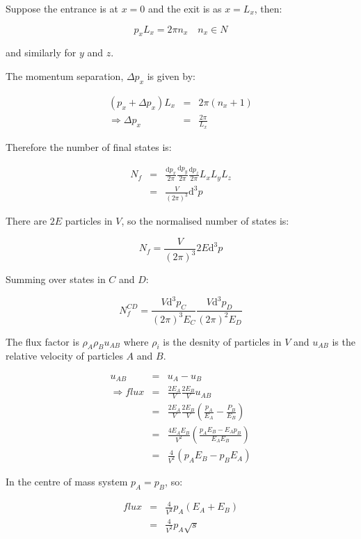 Suppose the entrance is at $x = 0$ and the exit is as $x = L_x$, then:

\[
  p_xL_x = 2\pi n_x \quad n_x \in N
\]

and similarly for $y$ and $z$.

The momentum separation, $\Delta p_x$ is given by:

\begin{eqnarray*}
  \left(p_x + \Delta p_x\right) L_x & = & 2\pi\left(n_x + 1\right) \\
  \Rightarrow \Delta p_x & = & \frac{2\pi}{L_x}
\end{eqnarray*}

Therefore the number of final states is:

\begin{eqnarray*}
  N_f & = & \frac{\mathrm{d}p_x}{2\pi}\frac{\mathrm{d}p_y}{2\pi}\frac{\mathrm{d}p_z}{2\pi}L_xL_yL_z \\
  & = & \frac{V}{\left(2\pi\right)^3}\mathrm{d}^3p
\end{eqnarray*}

There are $2E$ particles in $V$, so the normalised number of states is:

\[
  N_f = \frac{V}{\left(2\pi\right)^3}2E\mathrm{d}^3p
\]

Summing over states in $C$ and $D$:

\[
  N^{CD}_f = \frac{V\mathrm{d}^3p_C}{\left(2\pi\right)^3E_C}\frac{V\mathrm{d}^3p_D}{\left(2\pi\right)^2E_D}
\]

The flux factor is $\rho_A\rho_B u_{AB}$ where $\rho_i$ is the desnity of particles in $V$ and $u_{AB}$ is the relative velocity of particles $A$ and $B$.

\begin{eqnarray*}
  u_{AB} & = & u_A - u_B \\
  \Rightarrow flux & = & \frac{2E_A}{V}\frac{2E_B}{V}u_{AB} \\
  & = & \frac{2E_A}{V}\frac{2E_B}{V}\left(\frac{p_A}{E_A}-\frac{P_B}{E_B}\right) \\
  & = & \frac{4E_AE_B}{V^2}\left(\frac{p_AE_B-E_Ap_B}{E_AE_B}\right) \\
  & = & \frac{4}{V^2}\left(p_AE_B -p_BE_A\right)
\end{eqnarray*}

In the centre of mass system $p_A = p_B$, so:

\begin{eqnarray*}
  flux & = & \frac{4}{V^2}p_A\left(E_A + E_B\right) \\
  & = & \frac{4}{V^2}p_A\sqrt{s}
\end{eqnarray*}


